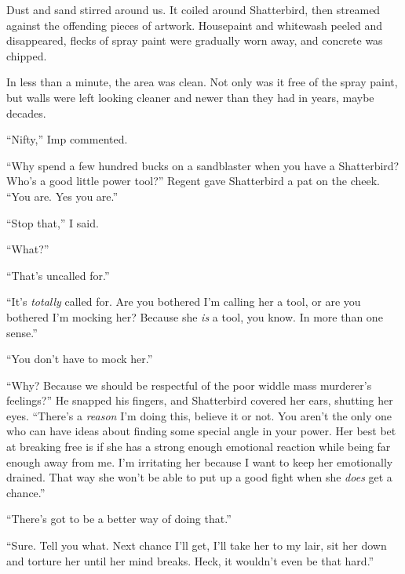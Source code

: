 Dust and sand stirred around us.  It coiled around Shatterbird, then streamed against the offending pieces of artwork.  Housepaint and whitewash peeled and disappeared, flecks of spray paint were gradually worn away, and concrete was chipped.



In less than a minute, the area was clean.  Not only was it free of the spray paint, but walls were left looking cleaner and newer than they had in years, maybe decades.



``Nifty,'' Imp commented.



``Why spend a few hundred bucks on a sandblaster when you have a Shatterbird?  Who's a good little power tool?''  Regent gave Shatterbird a pat on the cheek.  ``You are.  Yes you are.''



``Stop that,'' I said.



``What?''



``That's uncalled for.''



``It's \emph{totally} called for.  Are you bothered I'm calling her a tool, or are you bothered I'm mocking her?  Because she \emph{is} a tool, you know.  In more than one sense.''



``You don't have to mock her.''



``Why?  Because we should be respectful of the poor widdle mass murderer's feelings?''  He snapped his fingers, and Shatterbird covered her ears, shutting her eyes.  ``There's a \emph{reason} I'm doing this, believe it or not.  You aren't the only one who can have ideas about finding some special angle in your power.  Her best bet at breaking free is if she has a strong enough emotional reaction while being far enough away from me.  I'm irritating her because I want to keep her emotionally drained.  That way she won't be able to put up a good fight when she \emph{does} get a chance.''



``There's got to be a better way of doing that.''



``Sure.  Tell you what.  Next chance I'll get, I'll take her to my lair, sit her down and torture her until her mind breaks.  Heck, it wouldn't even be that hard.''



